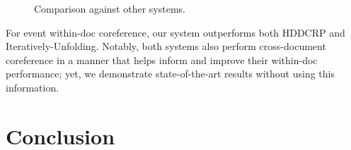 \documentclass[11pt,a4paper]{article}
\begin{document}
\begin{figure}
\label{fig:againstsystems}
\caption{Comparison against other systems.}
\end{figure}

For event within-doc coreference, our system outperforms both HDDCRP and Iteratively-Unfolding.  Notably, both systems also perform cross-document coreference in a manner that helps inform and improve their within-doc performance; yet, we demonstrate state-of-the-art results without using this information.

\section*{Conclusion}
%
%



\appendix
\end{document}
